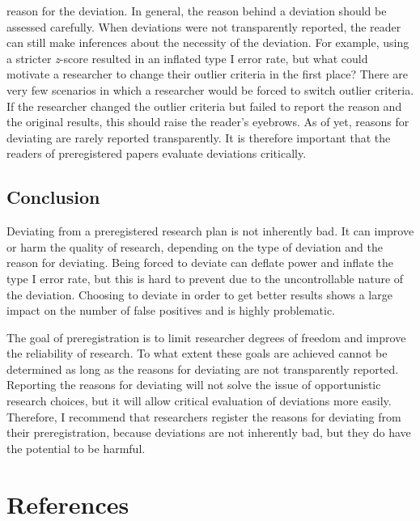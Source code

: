 \documentclass[
  man,
  floatsintext,
  longtable,
  nolmodern,
  notxfonts,
  notimes,
  colorlinks=true,linkcolor=blue,citecolor=blue,urlcolor=blue]{apa7}
\begin{document}
\begin{enumerate}
  reason for the deviation. In general, the reason behind a deviation
  should be assessed carefully. When deviations were not transparently
  reported, the reader can still make inferences about the necessity of
  the deviation. For example, using a stricter \emph{z}-score resulted
  in an inflated type I error rate, but what could motivate a researcher
  to change their outlier criteria in the first place? There are very
  few scenarios in which a researcher would be forced to switch outlier
  criteria. If the researcher changed the outlier criteria but failed to
  report the reason and the original results, this should raise the
  reader's eyebrows. As of yet, reasons for deviating are rarely
  reported transparently. It is therefore important that the readers of
  preregistered papers evaluate deviations critically.
\end{enumerate}

\subsection{Conclusion}\label{conclusion}

Deviating from a preregistered research plan is not inherently bad. It
can improve or harm the quality of research, depending on the type of
deviation and the reason for deviating. Being forced to deviate can
deflate power and inflate the type I error rate, but this is hard to
prevent due to the uncontrollable nature of the deviation. Choosing to
deviate in order to get better results shows a large impact on the
number of false positives and is highly problematic.

The goal of preregistration is to limit researcher degrees of freedom
and improve the reliability of research. To what extent these goals are
achieved cannot be determined as long as the reasons for deviating are
not transparently reported. Reporting the reasons for deviating will not
solve the issue of opportunistic research choices, but it will allow
critical evaluation of deviations more easily. Therefore, I recommend
that researchers register the reasons for deviating from their
preregistration, because deviations are not inherently bad, but they do
have the potential to be harmful.

\newpage

\section{References}\label{references}
\end{document}
